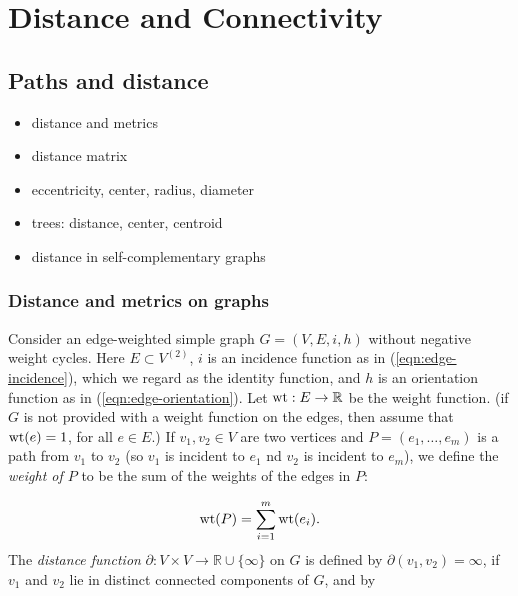 
\chapter{Distance and Connectivity}
\label{chap:distance_connectivity}



\section{Paths and distance}

\begin{itemize}
\item distance and metrics

\item distance matrix

\item eccentricity, center, radius, diameter

\item trees: distance, center, centroid

\item distance in self-complementary graphs
\end{itemize}

\subsection{Distance and metrics on graphs}

Consider an edge-weighted simple 
graph $G=(V,E,i,h)$ without negative weight
cycles. Here $E\subset V^{(2)}$,
$i$ is an incidence function as in 
(\ref{eqn:edge-incidence}), which we regard as the identity function,
and $h$ is an
orientation function as in (\ref{eqn:edge-orientation}).
Let ${\rm wt}:E\to {\mathbb{R}}$ be the weight function.
(if $G$ is not provided with a weight function on the edges,
then assume that ${\rm wt}(e)=1$, for all $e\in E$.)
If $v_1,v_2\in V$ are two vertices and $P=(e_1,\dots,e_m)$ is
a path from $v_1$ to $v_2$ (so $v_1$ is incident to $e_1$
nd $v_2$ is incident to $e_m$), we define the {\it weight of $P$}
to be the sum of the weights of the edges in $P$:

\[
{\rm wt}(P)=\sum_{i=1}^m {\rm wt}(e_i).
\]
The {\it distance function} $\partial:V\times V\to  {\mathbb{R}}\cup
\{\infty\}$ on 
$G$ is defined by $\partial(v_1,v_2) = \infty$,
if $v_1$ and $v_2$ lie in distinct connected
components of $G$, and by

